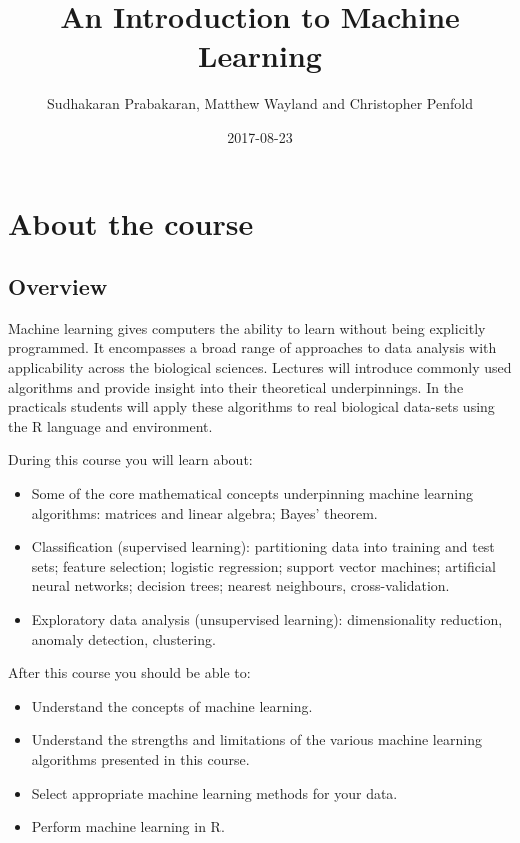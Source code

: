 \documentclass[]{book}
\title{An Introduction to Machine Learning}
\author{Sudhakaran Prabakaran, Matthew Wayland and Christopher Penfold}
\date{2017-08-23}
\providecommand{\tightlist}{%
  \setlength{\itemsep}{0pt}\setlength{\parskip}{0pt}}
\theoremstyle{definition}
\theoremstyle{definition}
\theoremstyle{remark}
\begin{document}
\maketitle

{
\setcounter{tocdepth}{1}
\tableofcontents
}
\chapter{About the course}\label{about-the-course}

\section{Overview}\label{overview}

Machine learning gives computers the ability to learn without being
explicitly programmed. It encompasses a broad range of approaches to
data analysis with applicability across the biological sciences.
Lectures will introduce commonly used algorithms and provide insight
into their theoretical underpinnings. In the practicals students will
apply these algorithms to real biological data-sets using the R language
and environment.

During this course you will learn about:

\begin{itemize}
\tightlist
\item
  Some of the core mathematical concepts underpinning machine learning
  algorithms: matrices and linear algebra; Bayes' theorem.
\item
  Classification (supervised learning): partitioning data into training
  and test sets; feature selection; logistic regression; support vector
  machines; artificial neural networks; decision trees; nearest
  neighbours, cross-validation.
\item
  Exploratory data analysis (unsupervised learning): dimensionality
  reduction, anomaly detection, clustering.
\end{itemize}

After this course you should be able to:

\begin{itemize}
\tightlist
\item
  Understand the concepts of machine learning.
\item
  Understand the strengths and limitations of the various machine
  learning algorithms presented in this course.
\item
  Select appropriate machine learning methods for your data.
\item
  Perform machine learning in R.
\end{itemize}
\end{document}

